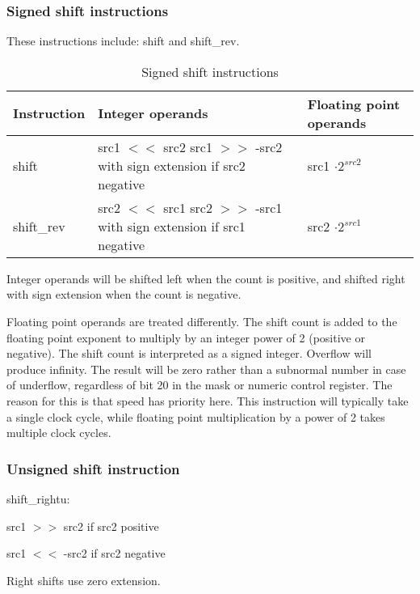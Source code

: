 \documentclass[forwardcom.tex]{subfiles}
\begin{document}
\subsubsection{Signed shift instructions}
These instructions include: shift and shift\_rev.

\begin{longtable} {|p{20mm}|p{60mm}|p{50mm}|}
\caption{Signed shift instructions} 
\label{table:SignedShiftInstructions} \\
\endfirsthead
\endhead
\hline
\bfseries Instruction & \bfseries Integer operands & \bfseries Floating point operands   \\
\hline
shift      & src1 $<<$ src2 \newline src1 $>>$ -src2 with sign extension if src2 negative &
  src1 $ \cdot 2^{src2} $ \\
\hline
shift\_rev & src2 $<<$ src1 \newline src2 $>>$ -src1 with sign extension if src1 negative & src2 $ \cdot 2^{src1} $ \\
\hline
\end{longtable}

Integer operands will be shifted left when the count is positive, and shifted right with
sign extension when the count is negative.
\vspace{2mm}

Floating point operands are treated differently. The shift count is added to the floating
point exponent to multiply by an integer power of 2 (positive or negative).
The shift count is interpreted as a signed integer. Overflow will produce
infinity. The result will be zero rather than a subnormal number in case of underflow,
regardless of bit 20 in the mask or numeric control register. The reason for this is that
speed has priority here. This instruction will typically take a single clock cycle, while
floating point multiplication by a power of 2 takes multiple clock cycles. 


\subsubsection{Unsigned shift instruction}

shift\_rightu: 

src1 $>>$ src2 if src2 positive

src1 $<<$ -src2 if src2 negative
\vspace{2mm}

Right shifts use zero extension. 
\end{document}
